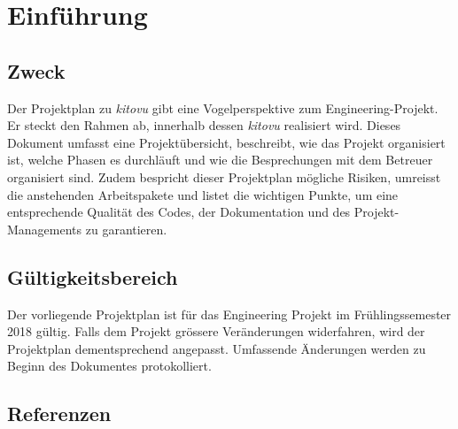 \documentclass[a4paper]{article}
\begin{document}
\section{Einführung}
\subsection{Zweck}
Der Projektplan zu \emph{kitovu} gibt eine Vogelperspektive zum Engineering-Projekt. Er steckt den Rahmen ab, innerhalb dessen \emph{kitovu} realisiert wird. Dieses Dokument umfasst eine Projektübersicht, beschreibt, wie das Projekt organisiert ist, welche Phasen es durchläuft und wie die Besprechungen mit dem Betreuer organisiert sind. Zudem bespricht dieser Projektplan mögliche Risiken, umreisst die anstehenden Arbeitspakete und listet die wichtigen Punkte, um eine entsprechende Qualität des Codes, der Dokumentation und des Projekt-Managements zu garantieren.

\subsection{Gültigkeitsbereich}
Der vorliegende Projektplan ist für das Engineering Projekt im Frühlingssemester 2018 gültig. Falls dem Projekt grössere Veränderungen widerfahren, wird der Projektplan dementsprechend angepasst. Umfassende Änderungen werden zu Beginn des Dokumentes protokolliert.

\subsection{Referenzen}

\end{document}

